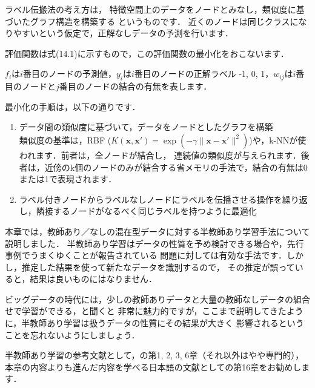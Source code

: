 
ラベル伝搬法の考え方は，
特徴空間上のデータをノードとみなし，類似度に基づいたグラフ構造を構築する
というものです．
近くのノードは同じクラスになりやすいという仮定で，正解なしデータの予測を行います．

評価関数は式(14.1)に示すもので，この評価関数の最小化をおこないます．


$f_i$は$i$番目のノードの予測値，$y_i$は$i$番目のノードの正解ラベル{ -1, 0, 1}，$w_{ij}$は$i$番目のノードと$j$番目のノードの結合の有無を表します．


最小化の手順は，以下の通りです．

\begin{enumerate}
\item データ間の類似度に基づいて，データをノードとしたグラフを構築\\
類似度の基準は，RBF ($K(\bm{x}, \bm{x}') = \exp(-\gamma \| \bm{x} -\bm{x}' \|^2 )$)や，k-NNが使われます．前者は，全ノードが結合し，
連続値の類似度が与えられます．後者は，近傍のk個のノードのみが結合する省メモリの手法で，結合の有無は0または1で表現されます．


\item ラベル付きノードからラベルなしノードにラベルを伝播させる操作を繰り返し，隣接するノードがなるべく同じラベルを持つように最適化
\end{enumerate}


本章では，教師あり／なしの混在型データに対する半教師あり学習手法について説明しました．
半教師あり学習はデータの性質を予め検討できる場合や，先行事例でうまくゆくことが報告されている
問題に対しては有効な手法です．しかし，推定した結果を使って新たなデータを識別するので，
その推定が誤っていると，結果は良いものにはなりません．

ビッグデータの時代には，少しの教師ありデータと大量の教師なしデータの組合せで学習ができる，と聞くと
非常に魅力的ですが，ここまで説明してきたように，半教師あり学習は扱うデータの性質にその結果が大きく
影響されるということを忘れないようにしましょう．

半教師あり学習の参考文献として，\cite{Chapelle10}の第1, 2, 3, 6章（それ以外はやや専門的），本章の内容よりも進んだ内容を学べる日本語の文献として\cite{sugiyama13}の第16章をお勧めします．

